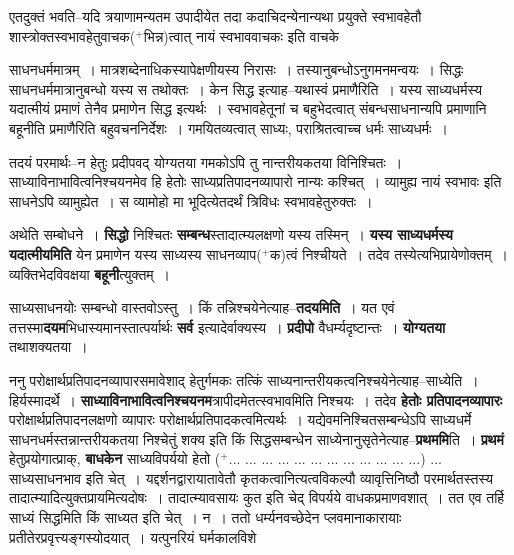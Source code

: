 \documentclass[article,12pt,a4paper]{memoir}
\newcommand{\add}[1]{($^{+}$#1)}
\begin{document}
	  \pstart एतदुक्तं भवति--यदि त्रयाणामन्यतम उपादीयेत तदा कदाचिदन्येनान्यथा प्रयुक्ते स्वभावहेतौ शास्त्रोक्तस्वभावहेतुवाचक\add{भिन्न}त्वात् नायं स्वभाववाचकः इति वाचके  \leavevmode{} 
	  
	साधनधर्ममात्रम् । मात्रशब्देनाधिकस्यापेक्षणीयस्य निरासः । तस्यानुबन्धोऽनुगमनमन्वयः । सिद्धः साधनधर्ममात्रानुबन्धो यस्य स तथोक्तः । केन सिद्ध इत्याह--यथास्वं प्रमाणैरिति । यस्य साध्यधर्मस्य यदात्मीयं प्रमाणं तेनैव प्रमाणेन सिद्ध इत्यर्थः । स्वभावहेतूनां च बहुभेदत्वात् संबन्धसाधनान्यपि प्रमाणानि बहूनीति प्रमाणैरिति बहुवचननिर्देशः । गमयितव्यत्वात् साध्यः, पराश्रितत्वाच्च धर्मः साध्यधर्मः ।  
	  
	तदयं परमार्थः--न हेतुः प्रदीपवद् योग्यतया गमकोऽपि तु नान्तरीयकतया विनिश्चितः । साध्याविनाभावित्वनिश्चयनमेव हि हेतोः साध्यप्रतिपादनव्यापारो नान्यः कश्चित् । व्यामुह्य नायं स्वभावः इति साधनेऽपि व्यामुह्येत । स व्यामोहो मा भूदित्येतदर्थं त्रिविधः स्वभावहेतुरुक्तः ।
	\pend
      

	  \pstart अथेति सम्बोधने । \textbf{सिद्धो} निश्चितः \textbf{सम्बन्ध}स्तादात्म्यलक्षणो यस्य तस्मिन् । \textbf{यस्य साध्यधर्मस्य यदात्मीयमिति} येन प्रमाणेन यस्य साध्यस्य साधनव्याप\add{क}त्वं निश्चीयते । तदेव तस्येत्यभिप्रायेणोक्तम् । व्यक्तिभेदविवक्षया \textbf{बहूनी}त्युक्तम् ।
	\pend
      

	  \pstart साध्यसाधनयोः सम्बन्धो वास्तवोऽस्तु । किं तन्निश्चयेनेत्याह--\textbf{तदयमिति} । यत एवं तत्तस्मा\textbf{दयम}भिधास्यमानस्तात्पर्यार्थः \textbf{सर्व} इत्यादेर्वाक्यस्य । \textbf{प्रदीपो} वैधर्म्यदृष्टान्तः । \textbf{योग्यतया} तथाशक्यतया ।
	\pend
      

	  \pstart ननु परोक्षार्थप्रतिपादनव्यापारसमावेशाद् हेतुर्गमकः तत्किं साध्यनान्तरीयकत्वनिश्चयेनेत्याह--साध्येति । हिर्यस्मादर्थे । \textbf{साध्याविनाभावित्वनिश्चयनम}त्रापीदमेतत्स्वभावमिति निश्चयः । तदेव \textbf{हेतोः प्रतिपादनव्यापारः} परोक्षार्थप्रतिपादनलक्षणो व्यापारः परोक्षार्थप्रतिपादकत्वमित्यर्थः । यद्येवमनिश्चितसम्बन्धेऽपि साध्यधर्मे साधनधर्मस्तन्नान्तरीयकतया निश्चेतुं शक्य इति किं सिद्धसम्बन्धेन साध्येनानुसृतेनेत्याह--\textbf{प्रथममि}ति । \textbf{प्रथमं} हेतुप्रयोगात्प्राक्, \textbf{बाधकेन} साध्यविपर्ययो हेतो\leavevmode{} \add{... ... ... ... ... ... ... ... ... ... ... ...} ...\leavevmode{} साध्यसाधनभाव इति चेत् । यद्दर्शनद्वारायातावेतौ कृतकत्वानित्यत्वविकल्पौ व्यावृत्तिनिष्ठौ परमार्थतस्तस्य तादात्म्यादित्युक्तप्रायमित्यदोषः । तादात्म्यावसायः कुत इति चेद् विपर्यये वाधकप्रमाणवशात् । तत एव तर्हि साध्यं सिद्धमिति किं साध्यत इति चेत् । न । ततो धर्म्यनवच्छेदेन प्लवमानाकारायाः प्रतीतेरप्रवृत्त्यङ्गस्योदयात् । यत्पुनरियं घर्मकालविशे  \leavevmode{} 
	  
\end{document}
